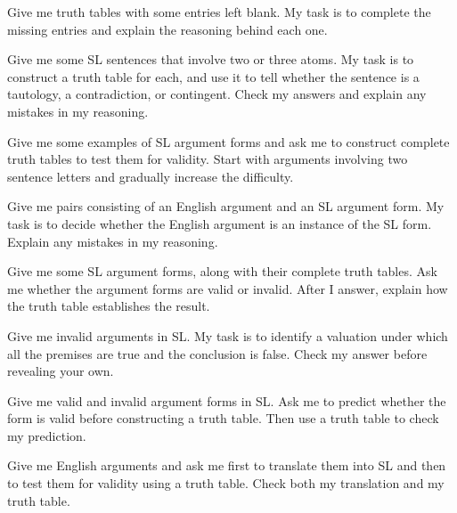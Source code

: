 \begin{genaipractice}[]
\item Give me truth tables with some entries left blank. My task is to complete the missing entries and explain the reasoning behind each one.
\item Give me some SL sentences that involve two or three atoms. My task is to construct a truth table for each, and use it to tell whether the sentence is a tautology, a contradiction, or contingent. Check my answers and explain any mistakes in my reasoning.
\item Give me some examples of SL argument forms and ask me to construct complete truth tables to test them for validity. Start with arguments involving two sentence letters and gradually increase the difficulty.
\item Give me pairs consisting of an English argument and an SL argument form. My task is to decide whether the English argument is an instance of the SL form. Explain any mistakes in my reasoning.
\item Give me some SL argument forms, along with their complete truth tables. Ask me whether the argument forms are valid or invalid. After I answer, explain how the truth table establishes the result.
\item Give me invalid arguments in SL. My task is to identify a valuation under which all the premises are true and the conclusion is false. Check my answer before revealing your own.
\item Give me valid and invalid argument forms in SL. Ask me to predict whether the form is valid before constructing a truth table. Then use a truth table to check my prediction.
\item Give me English arguments and ask me first to translate them into SL and then to test them for validity using a truth table. Check both my translation and my truth table.
\end{genaipractice}
